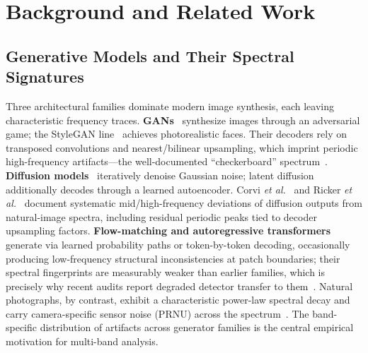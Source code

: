 \documentclass[journal]{IEEEtran}
\begin{document}
\section{Background and Related Work}
\label{sec:related}

\subsection{Generative Models and Their Spectral Signatures}
Three architectural families dominate modern image synthesis, each leaving characteristic frequency traces. \textbf{GANs}~\cite{goodfellow2014} synthesize images through an adversarial game; the StyleGAN line~\cite{karras2019} achieves photorealistic faces. Their decoders rely on transposed convolutions and nearest/bilinear upsampling, which imprint periodic high-frequency artifacts---the well-documented ``checkerboard'' spectrum~\cite{zhang2019wifs,durall2020}. \textbf{Diffusion models}~\cite{ho2020,rombach2022} iteratively denoise Gaussian noise; latent diffusion additionally decodes through a learned autoencoder. Corvi \textit{et al.}~\cite{corvi2023} and Ricker \textit{et al.}~\cite{ricker2024} document systematic mid/high-frequency deviations of diffusion outputs from natural-image spectra, including residual periodic peaks tied to decoder upsampling factors. \textbf{Flow-matching and autoregressive transformers}~\cite{esser2024,betker2023} generate via learned probability paths or token-by-token decoding, occasionally producing low-frequency structural inconsistencies at patch boundaries; their spectral fingerprints are measurably weaker than earlier families, which is precisely why recent audits report degraded detector transfer to them~\cite{li2025aigibench}. Natural photographs, by contrast, exhibit a characteristic power-law spectral decay and carry camera-specific sensor noise (PRNU) across the spectrum~\cite{cozzolino2019}. The band-specific distribution of artifacts across generator families is the central empirical motivation for multi-band analysis.
\end{document}
